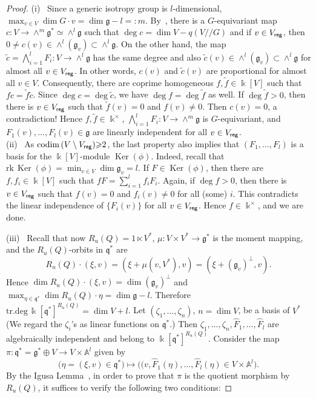 \begin{proof}
(i) \ Since a generic isotropy group is $l$-dimensional,
$\max_{v\in V}\dim G{\cdot}v =\dim{{\mathfrak g}}-l=:m$. By~\cite[Satz~1 \& Korollar~4]{kn86}, there is a 
$G$-equivariant map $c:V\to \wedge^m{{\mathfrak g}}^*\simeq \wedge^l{{\mathfrak g}}$ such that $\deg c=\dim V- q(V{/\!\!/} G)$ 
and if $v\in V_{\sf reg}$, then $0\ne c(v) \in \wedge^l({{\mathfrak g}}_v)\subset \wedge^l{{\mathfrak g}}$. On the other hand,
the map $\tilde c=\bigwedge_{i=1}^l F_i: V\to \wedge^l{{\mathfrak g}}$ has the same degree and also
$\tilde c(v) \in \wedge^l({{\mathfrak g}}_v)\subset \wedge^l{{\mathfrak g}}$ for almost all $v\in V_{\sf reg}$. In other words,
$c(v)$ and $\tilde c(v)$ are proportional for almost all $v\in V$. Consequently, there are coprime 
homogeneous $f,\tilde f\in {\Bbbk}[V]$ such that  $fc=\tilde f\tilde c$. Since $\deg c=\deg\tilde c$, 
we have
$\deg f=\deg\tilde f$ as well. If $\deg \tilde f>0$, then there is $v\in V_{\sf reg}$ such that $\tilde f(v)=0$ and $f(v)\ne 0$. Then $c(v)=0$, a contradiction! Hence $f,\tilde f\in {\Bbbk}^\times$,
$\bigwedge_{i=1}^l F_i: V\to \wedge^m{{\mathfrak g}}$ is $G$-equivariant,  and
$F_1(v),\dots, F_l(v)\in {{\mathfrak g}}$ are linearly independent for all $v\in V_{\sf reg}$.
\\ \indent
(ii) \ As ${{\mathrm{codim\,}}}(V\setminus V_{\sf reg}){\geqslant} 2$, the last property also implies that $(F_1,\dots, F_l)$ is 
a basis for the ${\Bbbk}[V]$-module ${\operatorname{Ker}}(\phi)$.
Indeed, recall that ${{\mathrm{rk\,}}} {\operatorname{Ker}}(\phi)=\min_{v\in V}\dim{{\mathfrak g}}_v=l$.
If $F\in {\operatorname{Ker}}(\phi)$, then there are $f,f_i\in {\Bbbk}[V]$ such that
$fF=\sum_{i=1}^l f_iF_i$. Again, if $\deg f>0$, then there is $v\in V_{\sf reg}$ such that $f(v)=0$ and
$f_i(v)\ne0$ for all (some) $i$. This contradicts the linear independence of  $\{F_i(v)\}$ for all 
$v\in V_{\sf reg}$. Hence $f\in {\Bbbk}^\times$, and we are done.

(iii) \ Recall that now $R_u(Q)=1\ltimes V^*$, $\mu: V\times V^*\to {{\mathfrak g}}^*$ is the moment mapping, and
the $R_u(Q)$-orbits in ${{\mathfrak q}}^*$ are 
\[
    R_u(Q){\cdot}(\xi,v)=(\xi+\mu(v, V^*), v)=(\xi+({{\mathfrak g}}_v)^\perp, v) .
\]
Hence $\dim R_u(Q){\cdot}(\xi,v)=\dim ({{\mathfrak g}}_v)^\perp$ and 
$\max_{\eta\in{{\mathfrak q}}^*} \dim R_u(Q){\cdot}\eta= \dim{{\mathfrak g}}-l$.  Therefore 
${{\mathrm{tr.deg\,}}} {\Bbbk}[{{\mathfrak q}}^*]^{R_u(Q)}=\dim V+l$. Let  $(\zeta_1,\dots,\zeta_n)$, $n=\dim V$, be a basis of 
$V^*$ (We regard the $\zeta_i$'s as linear functions on ${{\mathfrak q}}^*$.) 
Then $\zeta_1,\dots,\zeta_n, \hat F_1,\dots, \hat F_l$ are algebraically independent and belong to 
${\Bbbk}[{{\mathfrak q}}^*]^{R_u(Q)}$. Consider the map
$\pi:{{\mathfrak q}}^*={{\mathfrak g}}^*\oplus V \to V\times \mathbb A^l$ given by
\begin{equation}   \label{eq:pi}
   \bigl(\eta=(\xi, v) \in {{\mathfrak q}}^* \bigr) \mapsto   \bigl((v, \hat F_1(\eta),\dots,\hat F_l(\eta)\in
   V\times \mathbb A^l\bigr). 
\end{equation}
By the Igusa Lemma~\cite[Theorem\,4.12]{VP}, in order to prove that $\pi$ is the quotient morphism by
$R_u(Q)$,
it suffices to verify the following two conditions:


\end{proof}
